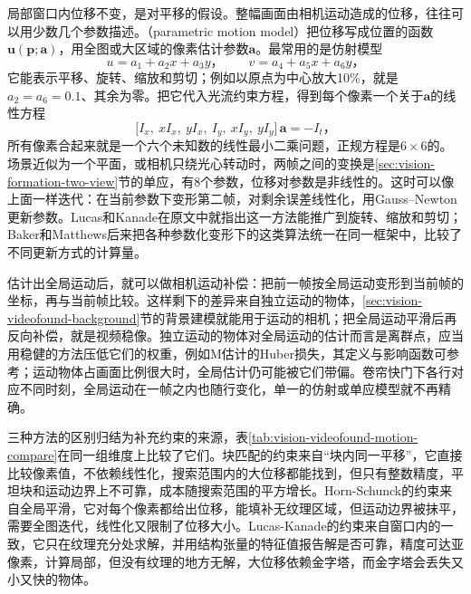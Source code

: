 局部窗口内位移不变，是对平移的假设。整幅画面由相机运动造成的位移，往往可以用少数几个参数描述。（parametric motion model）把位移写成位置的函数$\bm u(\bm p;\bm a)$，用全图或大区域的像素估计参数$\bm a$。最常用的是仿射模型
\[
  u=a_1+a_2x+a_3y\text{，}\qquad v=a_4+a_5x+a_6y\text{，}
\]
它能表示平移、旋转、缩放和剪切；例如以原点为中心放大10\%，就是$a_2=a_6=0.1$、其余为零。把它代入光流约束方程，得到每个像素一个关于$\bm a$的线性方程
\[
  \bigl[I_x,\ xI_x,\ yI_x,\ I_y,\ xI_y,\ yI_y\bigr]\,\bm a=-I_t\text{，}
\]
所有像素合起来就是一个六个未知数的线性最小二乘问题，正规方程是$6\times6$的。场景近似为一个平面，或相机只绕光心转动时，两帧之间的变换是\ref{sec:vision-formation-two-view}节的单应，有8个参数，位移对参数是非线性的。这时可以像上面一样迭代：在当前参数下变形第二帧，对剩余误差线性化，用Gauss--Newton更新参数。Lucas和Kanade在原文中就指出这一方法能推广到旋转、缩放和剪切；Baker和Matthews后来把各种参数化变形下的这类算法统一在同一框架中，比较了不同更新方式的计算量。

估计出全局运动后，就可以做相机运动补偿：把前一帧按全局运动变形到当前帧的坐标，再与当前帧比较。这样剩下的差异来自独立运动的物体，\ref{sec:vision-videofound-background}节的背景建模就能用于运动的相机；把全局运动平滑后再反向补偿，就是视频稳像。独立运动的物体对全局运动的估计而言是离群点，应当用稳健的方法压低它们的权重，例如M估计的Huber损失，其定义与影响函数可参考；运动物体占画面比例很大时，全局估计仍可能被它们带偏。卷帘快门下各行对应不同时刻，全局运动在一帧之内也随行变化，单一的仿射或单应模型就不再精确。

三种方法的区别归结为补充约束的来源，表\ref{tab:vision-videofound-motion-compare}在同一组维度上比较了它们。块匹配的约束来自“块内同一平移”，它直接比较像素值，不依赖线性化，搜索范围内的大位移都能找到，但只有整数精度，平坦块和运动边界上不可靠，成本随搜索范围的平方增长。Horn-Schunck的约束来自全局平滑，它对每个像素都给出位移，能填补无纹理区域，但运动边界被抹平，需要全图迭代，线性化又限制了位移大小。Lucas-Kanade的约束来自窗口内的一致，它只在纹理充分处求解，并用结构张量的特征值报告解是否可靠，精度可达亚像素，计算局部，但没有纹理的地方无解，大位移依赖金字塔，而金字塔会丢失又小又快的物体。

